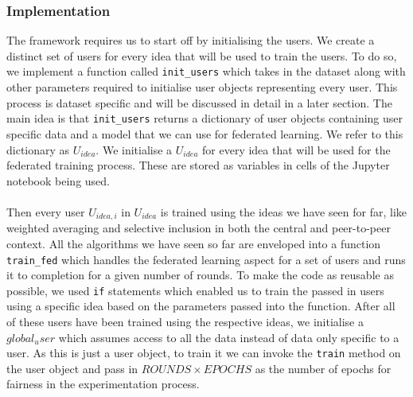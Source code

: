 \documentclass[12pt]{article}
\begin{document}
\subsubsection{Implementation}
The framework requires us to start off by initialising the users. We create a distinct set of users for every idea that will be used to train the users. To do so, we implement a function called \texttt{init\_users} which takes in the dataset along with other parameters required to initialise user objects representing every user. This process is dataset specific and will be discussed in detail in a later section. The main idea is that \texttt{init\_users} returns a dictionary of user objects containing user specific data and a model that we can use for federated learning. We refer to this dictionary as $U_{idea}$. We initialise a $U_{idea}$ for every idea that will be used for the federated training process. These are stored as variables in cells of the Jupyter notebook being used.
\\\\
Then every user $U_{idea,i}$ in $U_{idea}$ is trained using the ideas we have seen for far, like weighted averaging and selective inclusion in both the central and peer-to-peer context. All the algorithms we have seen so far are enveloped into a function \texttt{train\_fed} which handles the federated learning aspect for a set of users and runs it to completion for a given number of rounds. To make the code as reusable as possible, we used \texttt{if} statements which enabled us to train the passed in users using a specific idea based on the parameters passed into the function. After all of these users have been trained using the respective ideas, we initialise a $global_user$ which assumes access to all the data instead of data only specific to a user. As this is just a user object, to train it we can invoke the \texttt{train} method on the user object and pass in $ROUNDS \times EPOCHS$ as the number of epochs for fairness in the experimentation process.
\\\\
\end{document}
